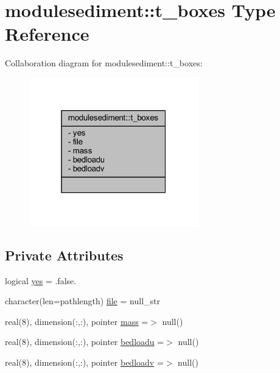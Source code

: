 \hypertarget{structmodulesediment_1_1t__boxes}{}\section{modulesediment\+:\+:t\+\_\+boxes Type Reference}
\label{structmodulesediment_1_1t__boxes}


Collaboration diagram for modulesediment\+:\+:t\+\_\+boxes\+:\nopagebreak
\begin{figure}[H]
\begin{center}
\leavevmode
\includegraphics[width=208pt]{structmodulesediment_1_1t__boxes__coll__graph}
\end{center}
\end{figure}
\subsection*{Private Attributes}
\begin{DoxyCompactItemize}
\item 
logical \mbox{\hyperlink{structmodulesediment_1_1t__boxes_a1590cac727f543b0fa5502c729c92091}{yes}} = .false.
\item 
character(len=pathlength) \mbox{\hyperlink{structmodulesediment_1_1t__boxes_aef9ced9b69e7ef82a3fb8ea62c8a4aa1}{file}} = null\+\_\+str
\item 
real(8), dimension(\+:,\+:), pointer \mbox{\hyperlink{structmodulesediment_1_1t__boxes_a9f1b40859b2464cae85db7d48ac28f5e}{mass}} =$>$ null()
\item 
real(8), dimension(\+:,\+:), pointer \mbox{\hyperlink{structmodulesediment_1_1t__boxes_a44d3c5f1f0035b84333652d783215b43}{bedloadu}} =$>$ null()
\item 
real(8), dimension(\+:,\+:), pointer \mbox{\hyperlink{structmodulesediment_1_1t__boxes_ad824d061652d855f957f8c2c4fd85b47}{bedloadv}} =$>$ null()
\end{DoxyCompactItemize}


